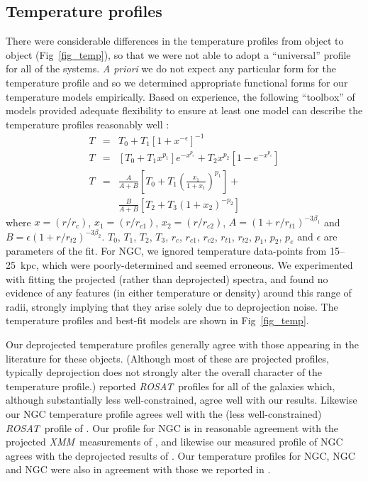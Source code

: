 \documentclass{emulateapj}
\newcommand{\xmm }{{\em XMM}}
\newcommand{\rosat }{{\em ROSAT}}
\newcommand{\thin}{\thinspace}
\begin{document}
\subsection{Temperature profiles} \label{sect_temp_profiles}
There were considerable differences
in the temperature profiles from object to object
(Fig~\ref{fig_temp}), so that we were not
able to adopt a ``universal'' profile for all of the systems.
{\em A priori} we do not expect any particular form for the temperature
profile and so we determined appropriate functional forms for our 
temperature models empirically. Based on experience, the following
``toolbox'' of models provided adequate flexibility to ensure
at least one model can describe
the temperature profiles reasonably well \citep[see][]{buote06a}:
\begin{eqnarray}
T & = & T_0 + T_1 \left[1+x^{-\epsilon}\right]^{-1} \label{eqn_trise2}\\
T & = & \left[T_0 + T_1 x^{p_1}\right]e^{-x^{p_e}} + T_2 x^{p_2} \left[1 - e^{-x^{p_e}}\right]
 \label{eqn_pow2expcut2} \\
T & = & \frac{A}{A+B}\left[ T_0+T_1\left( \frac{x_1}{1+x_1}\right)^{p_1} \right] 
+ \nonumber\\ & & \frac{B}{A+B}\left[ T_2+T_3(1+x_2)^{-p_2} \right] \label{eqn_twophase2}
\end{eqnarray}
where $x=(r/r_c)$,  $x_1=(r/r_{c1})$, $x_2=(r/r_{c2})$,
$A=(1+r/r_{t1})^{-3\beta_1}$ and $B=\epsilon (1+r/r_{t2})^{-3\beta_2}$.
$T_0$, $T_1$, $T_2$, ${T_3}$, $r_c$, $r_{c1}$, $r_{c2}$,
$r_{t1}$, $r_{t2}$,  $p_1$, ${p_2}$, $p_e$ and $\epsilon$ are parameters
of the fit. 
For NGC\thin 4261, we ignored temperature data-points from 15--25~kpc,
which were poorly-determined and seemed erroneous. We experimented with
fitting the projected (rather than deprojected) spectra, and found no
evidence of any features (in either temperature or density) around
this range of radii, strongly implying that they
arise solely due to deprojection noise. The temperature profiles and best-fit 
models are shown in Fig~\ref{fig_temp}.

Our deprojected temperature profiles generally agree with those 
appearing in the literature for these objects. (Although most
of these are projected profiles, typically deprojection does not 
strongly alter the overall character of the temperature profile.)
\citet{osullivan03a}
reported \rosat\ profiles for all of the galaxies which, although
substantially less well-constrained, agree well with our results. 
Likewise our NGC\thin 4472 temperature profile agrees well with 
the (less well-constrained) \rosat\ profile of \citet{irwin96}.
Our profile for NGC\thin 4649 is in reasonable agreement with the 
projected  \xmm\ measurements of \citet{randall05a}, and likewise our
measured profile of NGC\thin 6482 agrees with the deprojected
results of \citet{khosroshahi04a}. Our temperature profiles for 
NGC\thin 1407, NGC\thin 720 and NGC\thin 4472 were also in agreement
with those we reported in \citet{humphrey05a}.
\end{document}
